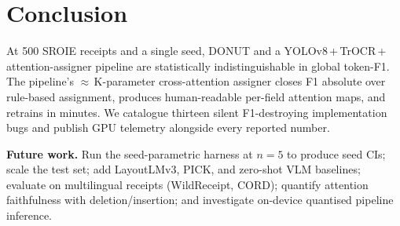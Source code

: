 \section{Conclusion}

At 500 SROIE receipts and a single seed, DONUT and a
YOLOv8\,+\,TrOCR\,+\,attention-assigner pipeline are statistically
indistinguishable in global token-F1.  The pipeline's
$\approx$\,K-parameter cross-attention
assigner closes  F1 absolute over rule-based
assignment, produces human-readable per-field attention maps, and
retrains in minutes.  We catalogue thirteen silent F1-destroying
implementation bugs and publish GPU telemetry alongside every
reported number.

\textbf{Future work.}
Run the seed-parametric harness at $n{=}5$ to produce seed CIs;
scale the test set; add LayoutLMv3, PICK, and zero-shot VLM
baselines; evaluate on multilingual receipts (WildReceipt, CORD);
quantify attention faithfulness with deletion/insertion; and
investigate on-device quantised pipeline inference.
